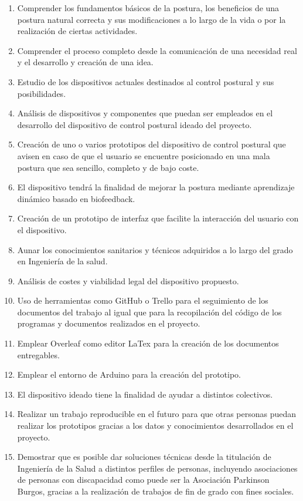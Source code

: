 \begin{enumerate}
    \item Comprender los fundamentos básicos de la postura, los beneficios de una postura natural correcta y sus modificaciones a lo largo de la vida o por la realización de ciertas actividades.
    \item Comprender el proceso completo desde la comunicación de una necesidad real y el desarrollo y creación de una idea.
    \item Estudio de los dispositivos actuales destinados al control postural y sus posibilidades.
    \item Análisis de dispositivos y componentes que puedan ser empleados en el desarrollo del dispositivo de control postural ideado del proyecto.
    \item Creación de uno o varios prototipos del dispositivo de control postural que avisen en caso de que el usuario se encuentre posicionado en una mala postura que sea sencillo, completo y de bajo coste.
    \item El dispositivo tendrá la finalidad de mejorar la postura mediante aprendizaje dinámico basado en biofeedback.
    \item Creación de un prototipo de interfaz que facilite la interacción del usuario con el dispositivo.
    \item Aunar los conocimientos sanitarios y técnicos adquiridos a lo largo del grado en Ingeniería de la salud.
    \item Análisis de costes y viabilidad legal del dispositivo propuesto.
    \item Uso de herramientas como GitHub\cite{GitHub} o Trello\cite{Trello} para el seguimiento de los documentos del trabajo al igual que para la recopilación del código de los programas y documentos realizados en el proyecto.
    \item Emplear Overleaf como editor LaTex para la creación de los documentos entregables.
    \item Emplear el entorno de Arduino para la creación del prototipo.
    \item El dispositivo ideado tiene la finalidad de ayudar a distintos colectivos.
    \item Realizar un trabajo reproducible en el futuro para que otras personas puedan realizar los prototipos gracias a los datos y conocimientos desarrollados en el proyecto.
    \item Demostrar que es posible dar soluciones técnicas desde la titulación de Ingeniería de la Salud a distintos perfiles de personas, incluyendo asociaciones de personas con discapacidad como puede ser la Asociación Parkinson Burgos\cite{ParkinsonBurgos}, gracias a la realización de trabajos de fin de grado con fines sociales.
\end{enumerate}









